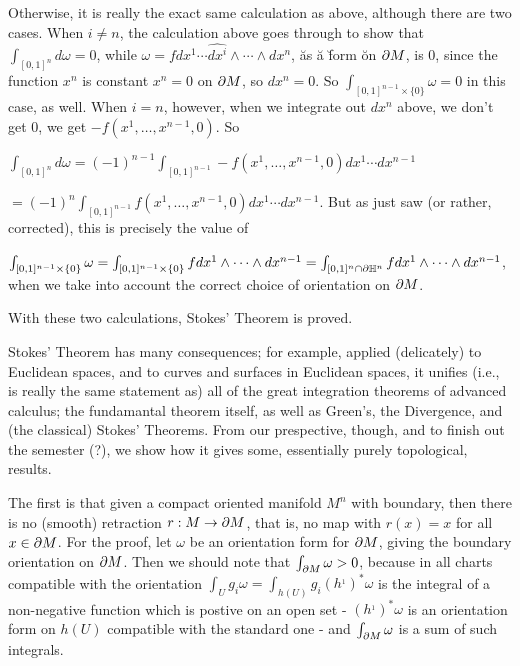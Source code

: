 Otherwise, it is really the exact same calculation as above, although there are two cases. When $i\neq n$,
the calculation above goes through to show that $\int_{[0,1]^n} d\omega = 0$,
while $\omega = f dx^1\cdots \widehat{dx^i}\wedge\cdots\wedge dx^n$, \u{as} \u{a} \u{form}
\u{on} \u{$\partial M$}, is $0$, since the function $x^n$ is constant $x^n=0$ on $\partial M$, so $dx^n=0$.
So $\int_{[0,1]^{n-1}\times\{0\}}\omega=0$ in this case, as well. When $i=n$, however, when we integrate out
$dx^n$ above, we don't get $0$, we get $-f(x^1,\ldots,x^{n-1},0)$. So

\noindent $\int_{[0,1]^n} d\omega =(-1)^{n-1}\int_{[0,1]^{n-1}}-f(x^1,\ldots,x^{n-1},0)dx^1\cdots dx^{n-1}$

\noindent $=(-1)^{n}\int_{[0,1]^{n-1}}f(x^1,\ldots,x^{n-1},0)dx^1\cdots dx^{n-1}$.
But as just saw (or rather, corrected), this is precisely the value of 

\noindent $\int_{[0,1]^{n-1}\times\{0\}}\omega=\int_{[0,1]^{n-1}\times\{0\}}fdx^1\wedge\cdots\wedge dx^{n-1}=
\int_{[0,1]^{n}\cap\partial{\Bbb H}^n}fdx^1\wedge\cdots\wedge dx^{n-1}$, when we take into account the correct
choice of orientation on $\partial M$.

\ssk

With these two calculations, Stokes' Theorem is proved.

\msk

Stokes' Theorem has many consequences; for example, applied (delicately) to Euclidean spaces, and
to curves and surfaces in Euclidean spaces, it unifies (i.e., is really the same statement as)
all of the great integration theorems of advanced calculus; the fundamantal theorem itself, as
well as Green's, the Divergence, and (the classical) Stokes' Theorems. From our prespective, though,
and to finish out the semester (?), we show how it gives some, essentially purely topological, results.

\ssk

The first is that given a compact oriented manifold $M^n$ with boundary, then there is no (smooth)
retraction $r:M\rightarrow \partial M$, that is, no map with $r(x)=x$ for all $x\in \partial M$. For the proof, 
let $\omega$ be an orientation form for $\partial M$, giving the boundary orientation on $\partial M$.
Then we should note that $\int_{\partial M}\omega >0$, because in all charts compatible with the 
orientation $\int_Ug_i\omega =\int_{h(U)}g_i(h^{_1})^*\omega$ is the integral of a non-negative
function which is postive on an open set - $(h^{_1})^*\omega$ is an orientation
form on $h(U)$ compatible with the standard one - and $\int_{\partial M}\omega$ is a sum of such integrals.

